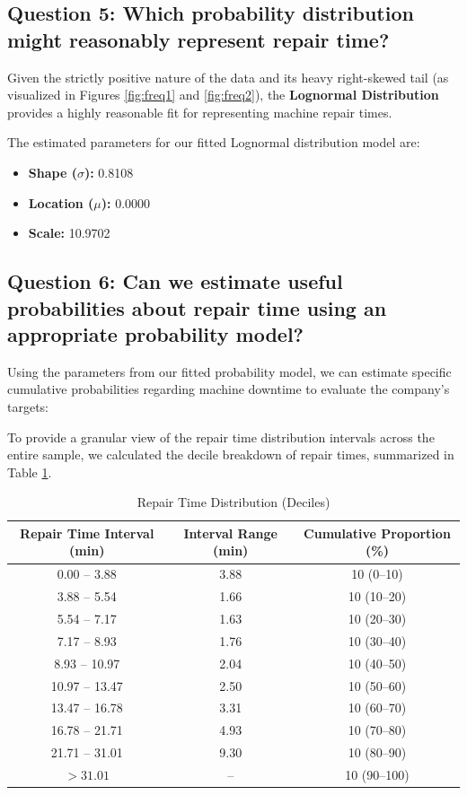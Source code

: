 \subsection*{Question 5: Which probability distribution might reasonably represent repair time?}

Given the strictly positive nature of the data and its heavy right-skewed tail (as visualized in Figures \ref{fig:freq1} and \ref{fig:freq2}), the \textbf{Lognormal Distribution} provides a highly reasonable fit for representing machine repair times. 

The estimated parameters for our fitted Lognormal distribution model are:
\begin{itemize}
    \item \textbf{Shape ($\sigma$):} 0.8108
    \item \textbf{Location ($\mu$):} 0.0000
    \item \textbf{Scale:} 10.9702
\end{itemize}

\subsection*{Question 6: Can we estimate useful probabilities about repair time using an appropriate probability model?}

Using the parameters from our fitted probability model, we can estimate specific cumulative probabilities regarding machine downtime to evaluate the company's targets:


To provide a granular view of the repair time distribution intervals across the entire sample, we calculated the decile breakdown of repair times, summarized in Table \ref{tab:deciles}.




\begin{table}[H]
    \centering
    \begin{tabular}{ccc}
        \toprule
        \textbf{Repair Time Interval (min)} &
        \textbf{Interval Range (min)} &
        \textbf{Cumulative Proportion (\%)} \\
        \midrule
        0.00 -- 3.88   & 3.88  & 10 (0--10) \\
        3.88 -- 5.54   & 1.66  & 10 (10--20) \\
        5.54 -- 7.17   & 1.63  & 10 (20--30) \\
        7.17 -- 8.93   & 1.76  & 10 (30--40) \\
        8.93 -- 10.97  & 2.04  & 10 (40--50) \\
        10.97 -- 13.47 & 2.50  & 10 (50--60) \\
        13.47 -- 16.78 & 3.31  & 10 (60--70) \\
        16.78 -- 21.71 & 4.93  & 10 (70--80) \\
        21.71 -- 31.01 & 9.30  & 10 (80--90) \\
        $> 31.01$      & --    & 10 (90--100) \\
        \bottomrule
    \end{tabular}
    \caption{Repair Time Distribution (Deciles)}
    \label{tab:deciles}
\end{table}

